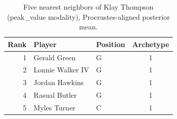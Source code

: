 \begin{table}[htbp]
  \centering\small
  \begin{tabular}{rllc}
    \toprule
    Rank & Player & Position & Archetype \\
    \midrule
    1 & Gerald Green & G & 1 \\
    2 & Lonnie Walker IV & G & 1 \\
    3 & Jordan Hawkins & G & 1 \\
    4 & Rasual Butler & G & 1 \\
    5 & Myles Turner & C & 1 \\
    \bottomrule
  \end{tabular}
  \caption{Five nearest neighbors of Klay Thompson (peak_value modality), Procrustes-aligned posterior mean.}
  \label{tab:Klay_Thompson_neighbors_peak_value}
\end{table}

